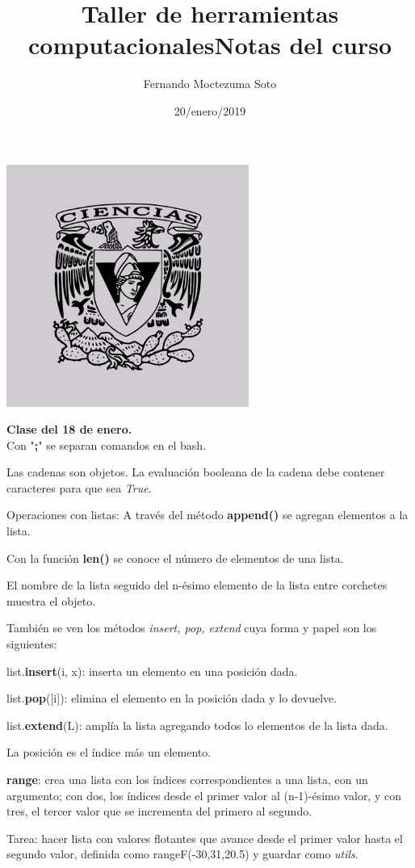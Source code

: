 \documentclass[etterpaper, 12pt, oneside]{article}%
\title{\Huge Taller de herramientas computacionales}
\author{Fernando Moctezuma Soto}
\date{20/enero/2019}
\begin{document}
	\maketitle
	
	\begin{center}
		\includegraphics[scale=0.40]{1.jpg}
	\end{center}
	
	\newpage
	
	\title{\Huge Notas del curso\\}
	
	\textbf{Clase del 18 de enero.}\\
	
	Con "\textbf{;}" se separan comandos en el bash.
	
	Las cadenas son objetos. La evaluación booleana de la cadena debe contener caracteres para que sea \emph{True}.
	
	Operaciones con listas:
	A través del método \textbf{append()} se agregan elementos a la lista.
	
	Con la función \textbf{len()} se conoce el número de elementos de una lista.
	
	El nombre de la lista seguido del n-ésimo elemento de la lista entre corchetes muestra el objeto.
	
	También se ven los métodos \emph{insert, pop, extend} cuya forma y papel son los siguientes:
	
	list.\textbf{insert}(i, x): inserta un elemento en una posición dada.
	
	list.\textbf{pop}([i]): elimina el elemento en la posición dada y lo devuelve.
	
	list.\textbf{extend}(L): amplía la lista agregando todos lo elementos de la lista dada.
	
	La posición es el índice más un elemento.
	
	\textbf{range}: crea una lista con los índices correspondientes a una lista, con un argumento; con dos, los índices desde el primer valor al (n-1)-ésimo valor, y con tres, el tercer valor que se incrementa del primero al segundo.
		
	Tarea: hacer lista con valores flotantes que avance desde el primer valor hasta el segundo valor, definida como rangeF(-30,31,20.5) y guardar como \emph{utils}.
	
	
\end{document}
